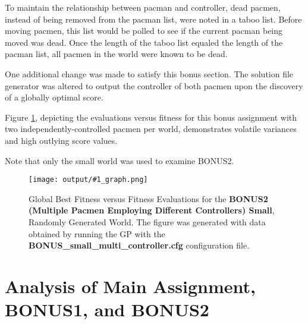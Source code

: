 \documentclass[11pt]{article}
\newcommand{\fitnessplotcaption}[2]{\caption{Global Best Fitness versus Fitness Evaluations for the \textbf{{#1}}, Randomly Generated World. The figure was generated with data obtained by running the GP with the \textbf{{#2}} configuration file.}}
\newcommand{\addgraphic}[1]{\centerline{\texttt{[image: output/\#1\_graph.png]}}}
\begin{document}
To maintain the relationship between pacman and controller, dead pacmen, instead of being
removed from the pacman list, were noted in a taboo list. Before moving pacmen, this list
would be polled to see if the current pacman being moved was dead. Once the length of the
taboo list equaled the length of the pacman list, all pacmen in the world were known to be 
dead.

One additional change was made to satisfy this bonus section. The solution file generator
was altered to output the controller of both pacmen upon the discovery of a globally optimal
score.

Figure \ref{fig:bonus_small_multi}, depicting the evaluations versus fitness for this bonus
assignment with two independently-controlled pacmen per world, demonstrates volatile 
variances and high outlying score values.

Note that only the small world was used to examine BONUS2.


\begin{figure}[H]
    \addgraphic{BONUS_small_multi_controller}
    \fitnessplotcaption{BONUS2 (Multiple Pacmen Employing Different Controllers) Small}{BONUS\_small\_multi\_controller.cfg}
    \label{fig:bonus_small_multi}
\end{figure}


\section{Analysis of Main Assignment, BONUS1, and BONUS2}
\end{document}
